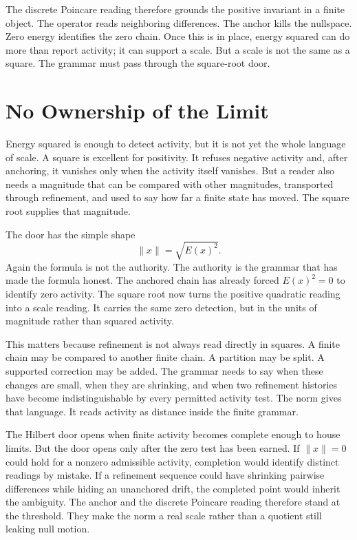The discrete Poincare reading therefore grounds the positive invariant in a
finite object. The operator reads neighboring differences. The anchor kills
the nullspace. Zero energy identifies the zero chain. Once this is in
place, energy squared can do more than report activity; it can support a
scale. But a scale is not the same as a square. The grammar must pass
through the square-root door.

\section{No Ownership of the Limit}

Energy squared is enough to detect activity, but it is not yet the whole
language of scale. A square is excellent for positivity. It refuses negative
activity and, after anchoring, it vanishes only when the activity itself
vanishes. But a reader also needs a magnitude that can be compared with
other magnitudes, transported through refinement, and used to say how far a
finite state has moved. The square root supplies that magnitude.

The door has the simple shape
\[
  \|x\| = \sqrt{E(x)^2}.
\]
Again the formula is not the authority. The authority is the grammar that
has made the formula honest. The anchored chain has already forced
\(E(x)^2=0\) to identify zero activity. The square root now turns the
positive quadratic reading into a scale reading. It carries the same zero
detection, but in the units of magnitude rather than squared activity.

This matters because refinement is not always read directly in squares. A
finite chain may be compared to another finite chain. A partition may be
split. A supported correction may be added. The grammar needs to say when
these changes are small, when they are shrinking, and when two refinement
histories have become indistinguishable by every permitted activity test.
The norm gives that language. It reads activity as distance inside the
finite grammar.

The Hilbert door opens when finite activity becomes complete enough to house
limits. But the door opens only after the zero test has been earned. If
\(\|x\|=0\) could hold for a nonzero admissible activity, completion would
identify distinct readings by mistake. If a refinement sequence could have
shrinking pairwise differences while hiding an unanchored drift, the
completed point would inherit the ambiguity. The anchor and the discrete
Poincare reading therefore stand at the threshold. They make the norm a real
scale rather than a quotient still leaking null motion.

